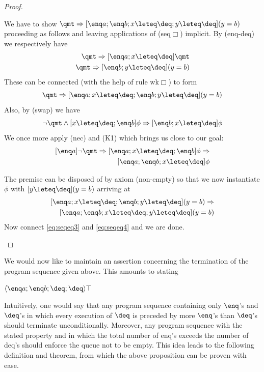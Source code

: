 \begin{proof}
\begin{itemize}
We have to show $\qmt \Rightarrow [\enq a; \enq b; x \leteq \deq; y \leteq
\deq](y=b)$ proceeding as follows and leaving applications of (seq$\Box$)
implicit. By (enq-deq) we respectively have
\[\begin{split}
\qmt \Rightarrow [\enq a; x\leteq \deq]\qmt\\
\qmt \Rightarrow [\enq b; y\leteq \deq](y=b)
\end{split}\]
These can be connected (with the help of rule wk$\Box$) to form
\begin{equation}
\label{eq:seqeq3}
\qmt \Rightarrow [\enq a; x\leteq \deq; \enq b; y\leteq \deq](y=b)
\end{equation}
Also, by (swap) we have
\[
\lnot \qmt \land [x\leteq \deq; \enq b]\phi \Rightarrow [\enq b; x\leteq \deq]\phi
\]
We once more apply (nec) and (K1) which brings us close to our goal:
\[ \begin{split}
[\enq a]\lnot \qmt \Rightarrow [\enq a;x\leteq \deq; \enq b]\phi \Rightarrow \\
    [\enq a; \enq b; x\leteq \deq]\phi
\end{split} \]

The premise can be disposed of by axiom (non-empty) so that we now
instantiate $\phi$ with $[y\leteq \deq](y=b)$ arriving at
\begin{equation}
\label{eq:seqeq4}
\begin{split}
[\enq a;x\leteq \deq; \enq b; y\leteq \deq](y=b) \Rightarrow \\
    [\enq a; \enq b; x\leteq \deq; y\leteq \deq](y=b)
\end{split}
\end{equation}
Now connect  \eqref{eq:seqeq3} and \eqref{eq:seqeq4} and we are done.

\end{itemize}
\end{proof}

We would now like to maintain an assertion concerning the termination of the
program sequence given above. This amounts to stating

\begin{prop}
$\langle \enq a; \enq b; \deq; \deq\rangle \top$
\end{prop}

Intuitively, one would say that any program sequence containing only $\enq$'s
and $\deq$'s in which every execution of $\deq$ is preceded by more $\enq$'s
than $\deq$'s should terminate unconditionally. Moreover, any program sequence
with the stated property and in which the total number of enq's exceeds the
number of deq's should enforce the queue not to be empty. This idea leads to the
following definition and theorem, from which the above proposition can be proven
with ease.

